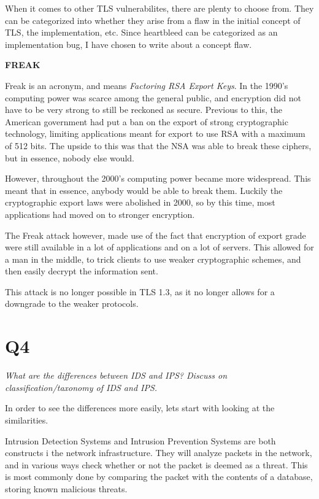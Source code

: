 \documentclass{article}
\begin{document}
When it comes to other TLS vulnerabilites, there are plenty to choose from. They can be categorized into whether they arise from a flaw in the initial concept of TLS, the implementation, etc. Since heartbleed can be categorized as an implementation bug, I have chosen to write about a concept flaw.

\textbf{FREAK}

Freak is an acronym, and means \textit{Factoring RSA Export Keys}. In the 1990's computing power was scarce among the general public, and encryption did not have to be very strong to still be reckoned as secure. Previous to this, the American government had put a ban on the export of strong cryptographic technology, limiting applications meant for export to use RSA with a maximum of 512 bits. The upside to this was that the NSA was able to break these ciphers, but in essence, nobody else would.

However, throughout the 2000's computing power became more widespread. This meant that in essence, anybody would be able to break them. Luckily the cryptographic export laws were abolished in 2000, so by this time, most applications had moved on to stronger encryption.

The Freak attack however, made use of the fact that encryption of export grade were still available in a lot of applications and on a lot of servers. This allowed for a man in the middle, to trick clients to use weaker cryptographic schemes, and then easily decrypt the information sent.

This attack is no longer possible in TLS 1.3, as it no longer allows for a downgrade to the weaker protocols.

\newpage
\section{Q4}
\begin{tcolorbox}
  \textit{What are the differences between IDS and IPS? Discuss on classification/taxonomy of IDS and IPS.}
\end{tcolorbox}
In order to see the differences more easily, lets start with looking at the similarities.

Intrusion Detection Systems and Intrusion Prevention Systems are both constructs i the network infrastructure. They will analyze packets in the network, and in various ways check whether or not the packet is deemed as a threat. This is most commonly done by comparing the packet with the contents of a database, storing known malicious threats.
\end{document}
